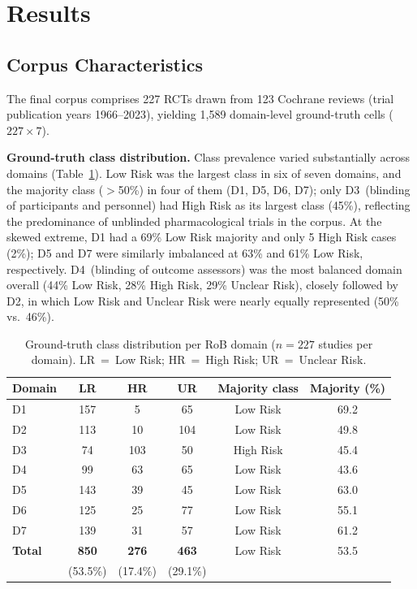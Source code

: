\documentclass[../main.tex]{subfiles}
\begin{document}
\section{Results}
\label{sec:results}

\subsection{Corpus Characteristics}
\label{sec:corpus}

The final corpus comprises 227 RCTs drawn from 123 Cochrane reviews (trial
publication years 1966--2023), yielding 1{,}589 domain-level ground-truth cells
($227 \times 7$).

\textbf{Ground-truth class distribution.}
Class prevalence varied substantially across domains (Table~\ref{tab:class-dist}).
Low Risk was the largest class in six of seven domains, and the majority class
($>$50\%) in four of them (D1, D5, D6, D7); only D3~(blinding of participants
and personnel) had High Risk as its largest class (45\%), reflecting the
predominance of unblinded pharmacological trials in the corpus.
At the skewed extreme, D1 had a 69\% Low Risk majority and only 5 High Risk cases
(2\%); D5 and D7 were similarly imbalanced at 63\% and 61\% Low Risk, respectively.
D4~(blinding of outcome assessors) was the most balanced domain overall
(44\% Low Risk, 28\% High Risk, 29\% Unclear Risk), closely followed by D2, in
which Low Risk and Unclear Risk were nearly equally represented (50\% vs.\ 46\%).

\begin{table}[ht]
\centering
\caption{Ground-truth class distribution per RoB domain ($n = 227$ studies per
domain). LR~=~Low Risk; HR~=~High Risk; UR~=~Unclear Risk.}
\label{tab:class-dist}
\begin{tabular}{lccccc}
\toprule
Domain & LR & HR & UR & Majority class & Majority (\%) \\
\midrule
D1 & 157 &   5 &  65 & Low Risk   & 69.2 \\
D2 & 113 &  10 & 104 & Low Risk   & 49.8 \\
D3 &  74 & 103 &  50 & High Risk  & 45.4 \\
D4 &  99 &  63 &  65 & Low Risk   & 43.6 \\
D5 & 143 &  39 &  45 & Low Risk   & 63.0 \\
D6 & 125 &  25 &  77 & Low Risk   & 55.1 \\
D7 & 139 &  31 &  57 & Low Risk   & 61.2 \\
\midrule
\textbf{Total} & \textbf{850} & \textbf{276} & \textbf{463} & Low Risk & 53.5 \\
               & (53.5\%)     & (17.4\%)     & (29.1\%)     &          &      \\
\bottomrule
\end{tabular}
\end{table}
\end{document}
